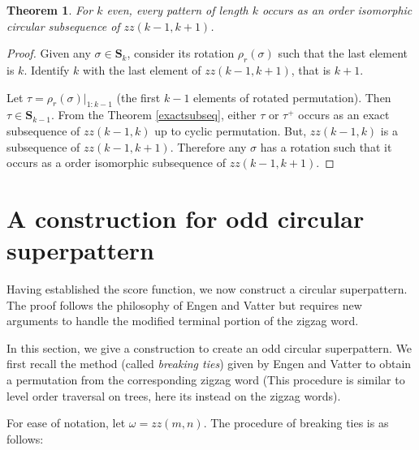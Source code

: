 \documentclass[a4paper,12pt]{article}
\newtheorem{theorem}{Theorem}[section]
\theoremstyle{definition}
\numberwithin{equation}{section}
\begin{document}
\begin{theorem}
     For $k$ even, every pattern of length $k$ occurs as an order isomorphic circular subsequence of $zz(k-1,k+1)$. 
\end{theorem}
\begin{proof}
Given any $\sigma \in \mathbf{S}_k$, consider its rotation $\rho_r(\sigma)$ such that the last element is $k$. Identify $k$ with the last element of $zz(k-1,k+1)$, that is $k+1$. \par
Let $\tau = \rho_r(\sigma)|_{1:k-1}$ (the first $k-1$ elements of rotated permutation). Then $\tau \in \mathbf{S}_{k-1}$. From the Theorem \ref{exactsubseq}, either $\tau$ or $\tau^+$ occurs as an exact subsequence of $zz(k-1,k)$ up to cyclic permutation. But, $zz(k-1,k)$ is a subsequence of $zz(k-1,k+1)$. Therefore any $\sigma$ has a rotation such that it occurs as a order isomorphic subsequence of $zz(k-1,k+1)$.
\end{proof}

\section{A construction for odd circular superpattern}

Having established the score function, we now construct a circular superpattern. The proof follows the philosophy of Engen and Vatter but requires new arguments to handle the modified terminal portion of the zigzag word.

In this section, we give a construction to create an odd circular superpattern. We first recall the method (called \emph{breaking ties}) given by Engen and Vatter \cite{engen2020containing} to obtain a permutation from the corresponding zigzag word (This procedure is similar to level order traversal on trees, here its instead on the zigzag words).%

For ease of notation, let $\omega = zz(m,n)$. The procedure of breaking ties is as follows:

\end{document}
